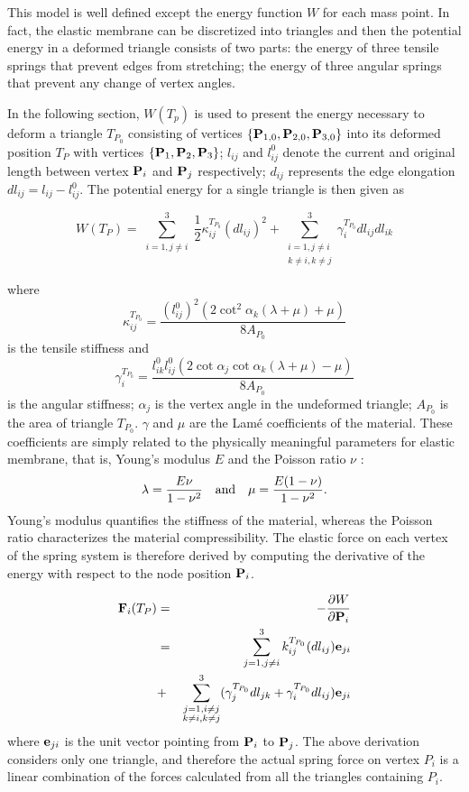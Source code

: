 This model is well defined except the energy function $W$ for each mass point. In fact, the elastic membrane can be discretized into triangles and then the potential energy in a deformed triangle consists of two parts: the energy of three tensile springs that prevent edges from stretching; the energy of three angular springs that prevent any change of vertex angles. 

In the following section, $W(T_p)$ is used to present the energy necessary to deform a triangle $T_{P_0}$ consisting of vertices $\{\mathbf{P}_{1,0}, \mathbf{P}_{2,0}, \mathbf{P}_{3,0}\}$ into  its deformed position $T_P$ with vertices $\{\mathbf{P}_{1}, \mathbf{P}_{2}, \mathbf{P}_{3}\}$; $l_{ij}$ and $l_{ij}^0$ denote the current and original length between vertex $\mathbf{P}_i$ and $\mathbf{P}_j$ respectively; $d_{ij}$ represents the edge elongation $dl_{ij} = l_{ij}-l_{ij}^0$. The potential energy for a single triangle is then given as \cite{Delinget2008} 

\[
W(T_{P})=\sum_{\substack{i=1, j \neq i}}^{3}\frac{1}{2}\kappa_{ij}^{T_{P_0}}
(dl_{ij})^{2}+\sum_{\substack{i=1, j \neq i \\ k \neq i, k \neq j}}^{3}\gamma_{i}^{T_{P_0}}dl_{ij}dl_{ik} 
\]

where \[
\kappa_{ij}^{T_{P_0}}=\frac{(l_{ij}^{0})^{2}(2\cot^{2}\alpha_{k}
(\lambda+\mu)+\mu)}{8A_{P_0}} \] 
is the tensile stiffness and
\begin{equation}
\gamma_{i}^{T_{P_0}}=\frac{l_{ik}^{0}l_{ij}^{0}(2\cot\alpha_{j}
\cot\alpha_{k}(\lambda+\mu)-\mu)}{8A_{P_0}} \label{eq:angular_stiff}
\end{equation} 
is the angular stiffness; $\alpha_j$ is the vertex angle in the undeformed triangle; $A_{P_0}$ is the area of triangle $T_{P_0}$. $\gamma$ and $\mu$ are the Lam\'{e}
coefficients of the material.  These coefficients are simply related to the
physically meaningful parameters for elastic membrane,
that is, Young's modulus $E$ and the Poisson ratio $\nu$ \cite{Gere2004}:
$$\lambda=\frac{E\nu}{1-\nu^{2}} ~~~{\rm and}~~~
\mu=\frac{E(1-\nu)}{1-\nu^{2}}.$$ 
Young's modulus quantifies the stiffness of
the material, whereas the Poisson ratio characterizes the material
compressibility. The elastic force on each vertex of the spring system is
therefore derived by computing the derivative of the energy with respect 
to the node position $\mathbf{P}_i$.

\begin{eqnarray} 
\mathbf{F}_i(T_{P}) & = & -\frac{\partial W}{\partial \mathbf{P}_i}\\
& = & \sum_{j = 1, j \neq i}^3 k^{T_{P_0}}_{ij}(dl_{ij})\mathbf{e}_{ji} \\
& + & \sum_{\substack{j=1, i\neq j \\ k \neq i, k \neq j}}^3
(\gamma_j^{T_{P_0}} dl_{jk} + \gamma_i^{T_{P_0}} dl_{ij}) \mathbf{e}_{ji}
\label{eq:v_force} 
\end{eqnarray} 
where $\mathbf{e}_{ji}$ is the unit vector pointing from $\mathbf{P}_i$ to $\mathbf{P}_j$.
The above derivation considers only one triangle, and therefore the actual spring force on vertex $P_i$ is a linear combination of the forces calculated from all the triangles containing $P_i$. 

